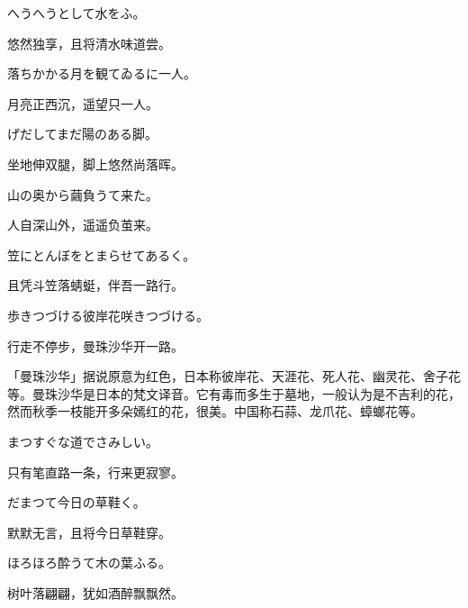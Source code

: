 \begin{haiku}
    {\FH へうへうとして水をふ。}

    {\FK 悠然独享，且将清水味道尝。}
\end{haiku}

\begin{haiku}
    {\FH 落ちかかる月を観てゐるに一人。}

    {\FK 月亮正西沉，遥望只一人。}
\end{haiku}

\begin{haiku}
    {\FH {}げだしてまだ陽のある脚。}

    {\FK 坐地伸双腿，脚上悠然尚落晖。}
\end{haiku}

\begin{haiku}
    {\FH 山の奥から繭負うて来た。}

    {\FK 人自深山外，遥遥负茧来。}
\end{haiku}

\begin{haiku}
    {\FH 笠にとんぼをとまらせてあるく。}

    {\FK 且凭斗笠落蜻蜓，伴吾一路行。}
\end{haiku}

\begin{haiku}
    {\FH 歩きつづける彼岸花咲きつづける。}

    {\FK 行走不停步，曼珠沙华开一路。}

    {\FS「曼珠沙华」据说原意为红色，日本称彼岸花、天涯花、死人花、幽灵花、舍子花等。曼珠沙华是日本的梵文译音。它有毒而多生于墓地，一般认为是不吉利的花，然而秋季一枝能开多朵嫣红的花，很美。中国称石蒜、龙爪花、蟑螂花等。}
\end{haiku}

\begin{haiku}
    {\FH まつすぐな道でさみしい。}

    {\FK 只有笔直路一条，行来更寂寥。}
\end{haiku}

\begin{haiku}
    {\FH だまつて今日の草鞋く。}

    {\FK 默默无言，且将今日草鞋穿。}
\end{haiku}

\begin{haiku}
    {\FH ほろほろ酔うて木の葉ふる。}

    {\FK 树叶落翩翩，犹如酒醉飘飘然。}
\end{haiku}

